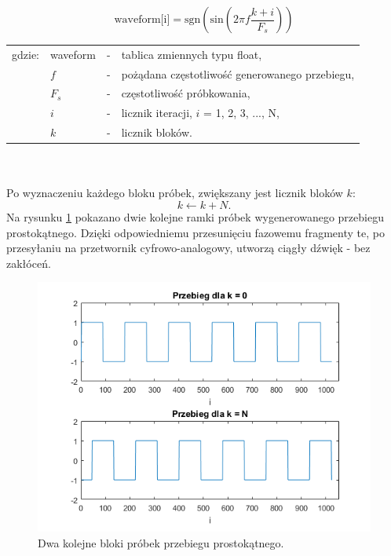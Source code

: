 \begin{equation} \label{equ:sub_1}
\text{waveform[i]}=\text{sgn}(\text{sin}(2\pi f\frac{k+i}{F_s}))
\end{equation}
\begin{tabular}{ l l l l}
	gdzie: & waveform &  - & tablica zmiennych typu float, \\
	&	$f$ & - &  pożądana częstotliwość generowanego przebiegu, \\
	&	$F_s$ & - & częstotliwość próbkowania,\\
	&	$i$ & - &  licznik iteracji, $i$ = 1, 2, 3, ..., N,\\
	&	$k$ & - &  licznik bloków.\\
\end{tabular} \\ \\
Po wyznaczeniu każdego bloku próbek, zwiększany jest licznik bloków $k$:
\begin{equation} \label{equ:sub_2}
k \gets k + N.
\end{equation}
Na rysunku \ref{rys:sub_waveform_blocks} pokazano dwie kolejne ramki próbek wygenerowanego przebiegu prostokątnego. Dzięki odpowiedniemu przesunięciu fazowemu fragmenty te, po przesyłaniu na przetwornik cyfrowo-analogowy, utworzą ciągły dźwięk - bez zakłóceń.
\begin{figure}[H]
	\centering
	\includegraphics[width=12cm]{grafiki/sub_waveform_blocks}
	\captionsetup{justification=centering}
	\caption{Dwa kolejne bloki próbek przebiegu prostokątnego.}
	\label{rys:sub_waveform_blocks}
\end{figure}

